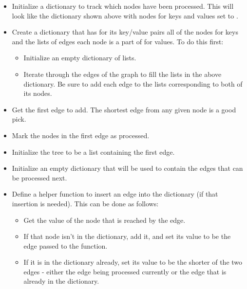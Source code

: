 \begin{itemize}


\item Initialize a dictionary to track which nodes have been processed. This will look like the dictionary shown above with nodes for keys and values set to .

\item Create a dictionary that has for its key/value pairs all of the nodes for keys and the lists of edges each node is a part of for values. To do this first:
	\begin{itemize}
	\item Initialize an empty dictionary of lists.

	\item Iterate through the edges of the graph to fill the lists in the above dictionary.
		Be sure to add each edge to the lists corresponding to both of its nodes.
	\end{itemize}
\item Get the first edge to add. The shortest edge from any given node is a good pick.
\item Mark the nodes in the first edge as processed.

\item Initialize the tree to be a list containing the first edge.

\item Initialize an empty dictionary that will be used to contain the edges that can be processed next.

\item Define a helper function to insert an edge into the dictionary (if that insertion is needed).
	This can be done as follows:

	\begin{itemize}

	\item Get the value of the node that is reached by the edge.

	\item If that node isn't in the dictionary, add it, and set its value to be the edge passed to the function.

	\item If it is in the dictionary already, set its value to be the shorter of the two edges -  either the edge being processed currently or the edge that is already in the dictionary.


\end{itemize}
\end{itemize}
